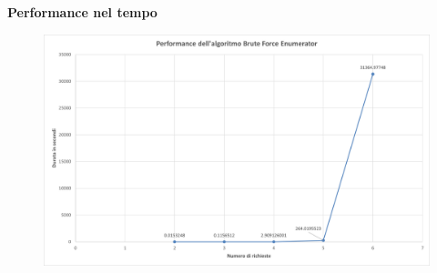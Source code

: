 \documentclass[9pt]{beamer}
\begin{document}
\begin{frame}[allowframebreaks]{\subsecname}
\framebreak

	\textbf{Performance nel tempo}
      	\begin{figure}[h]
	\centering
	\includegraphics[width=\textwidth]
	{../charts/01 Performance dell'algoritmo Brute Force Enumerator}
	\end{figure}

\end{frame}
\end{document}
